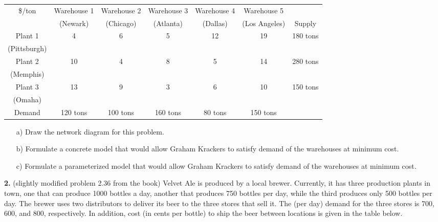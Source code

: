 \documentclass[11pt]{article}
\theoremstyle{definition}
\begin{document}
\begin{center}\begin{tabular}{|ccccccc|}\hline
  \$/ton   & Warehouse 1 & Warehouse 2 & Warehouse 3 & Warehouse 4 & Warehouse 5 &            \\
           &   (Newark) &  (Chicago) &  (Atlanta) &   (Dallas) & (Los Angeles) &   Supply   \\\cline{2-7}
   Plant 1 & \multicolumn{1}{|c|}{4} & \multicolumn{1}{|c|}{6} & \multicolumn{1}{|c|}{5} & \multicolumn{1}{|c|}{12} & \multicolumn{1}{|c|}{19} &    180 tons \\
(Pittsburgh) & \multicolumn{1}{|c|}{} & \multicolumn{1}{|c|}{} & \multicolumn{1}{|c|}{} & \multicolumn{1}{|c|}{} & \multicolumn{1}{|c|}{} &            \\ \cline{2-6}
   Plant 2 & \multicolumn{1}{|c|}{10} & \multicolumn{1}{|c|}{4} & \multicolumn{1}{|c|}{8} & \multicolumn{1}{|c|}{5} & \multicolumn{1}{|c|}{14} &    280 tons \\
 (Memphis) & \multicolumn{1}{|c|}{} & \multicolumn{1}{|c|}{} & \multicolumn{1}{|c|}{} & \multicolumn{1}{|c|}{} & \multicolumn{1}{|c|}{} &            \\ \cline{2-6}
   Plant 3 & \multicolumn{1}{|c|}{13} & \multicolumn{1}{|c|}{9} & \multicolumn{1}{|c|}{3} & \multicolumn{1}{|c|}{6} & \multicolumn{1}{|c|}{10} &    150 tons \\
   (Omaha) & \multicolumn{1}{|c|}{} & \multicolumn{1}{|c|}{} & \multicolumn{1}{|c|}{} & \multicolumn{1}{|c|}{} & \multicolumn{1}{|c|}{} &            \\ \cline{1-6}
   Demand &    120 tons &    100 tons &    160 tons &     80 tons &    150 tons &            \\ \hline
\end{tabular}\end{center}

\begin{enumerate}
\item[a)] Draw the network diagram for this problem.
\item[b)] Formulate a concrete model that would allow Graham Krackers to satisfy demand of the warehouses at minimum cost.
\item[c)] Formulate a parameterized model that would allow Graham Krackers to satisfy demand of the warehouses at minimum cost.
\end{enumerate}

\newpage

\textbf{2.} (slightly modified problem 2.36 from the book) Velvet Ale is produced by a local brewer. Currently, it has three production plants in town, one that can produce 1000 bottles a day, another that produces 750 bottles per day, while the third produces only 500 bottles per day. The brewer uses two distributors to deliver its beer to the three stores that sell it. The (per day) demand for the three stores is 700, 600, and 800, respectively. In addition, cost (in cents per bottle) to ship the beer between locations is given in the table below.
\end{document}
